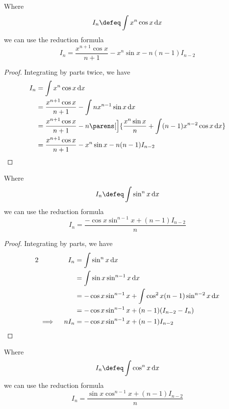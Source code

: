 \begin{theorem}
 Where
 \begin{equation*}
  I_n \defeq \integ{x^n \cos x}{x}
 \end{equation*}
 we can use the reduction formula
 \begin{equation*}
  I_n = \frac{x^{n + 1} \cos x}{n + 1} - x^n \sin x - n(n - 1)I_{n - 2}
 \end{equation*}
\end{theorem}
\begin{proof}
 Integrating by parts twice, we have
 \begin{align*}
  I_n &= \integ{x^n \cos x}{x} \\
      &= \frac{x^{n + 1} \cos x}{n + 1} - \integ{n x^{n - 1} \sin x}{x} \\
      &= \frac{x^{n + 1} \cos x}{n + 1} - n\parens[\Big]{
       \frac{x^n \sin x}{n} + \integ{(n - 1)x^{n - 2} \cos x}{x}} \\
      &= \frac{x^{n + 1} \cos x}{n + 1} - x^n \sin x - n(n - 1)I_{n - 2}
       \qedhere
 \end{align*}
\end{proof}
\begin{theorem}
 Where
 \begin{equation*}
  I_n \defeq \integ{\sin^n x}{x}
 \end{equation*}
 we can use the reduction formula
 \begin{equation*}
  I_n = \frac{-\cos x \sin^{n - 1} x + (n - 1) I_{n - 2}} n
 \end{equation*}
\end{theorem}
\begin{proof}
 Integrating by parts, we have
 \begin{alignat*}2
  && I_n &= \integ{\sin^n x}{x} \\
  &&     &= \integ{\sin x \sin^{n - 1}x}{x} \\
  &&     &= -\cos x \sin^{n - 1} x +
             \integ{\cos^2 x (n - 1) \sin^{n - 2} x}{x} \\
  &&     &= -\cos x \sin^{n - 1} x + (n - 1)(I_{n - 2} - I_n) \\
  &\implies{}& n I_n &= -\cos x \sin^{n - 1} x + (n - 1)I_{n - 2} \qedhere
 \end{alignat*}
\end{proof}
\begin{theorem}
 Where
 \begin{equation*}
  I_n \defeq \integ{\cos^n x}{x}
 \end{equation*}
 we can use the reduction formula
 \begin{equation*}
  I_n = \frac{\sin x \cos^{n - 1} x + (n - 1) I_{n - 2}} n
 \end{equation*}
\end{theorem}
